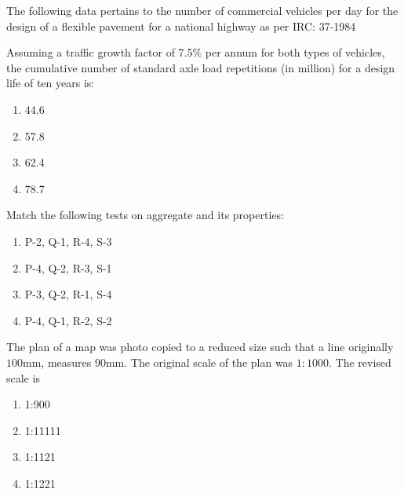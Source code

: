     \item{
	
			The following data pertains to the number of commercial vehicles per day for the design of a flexible pavement for a national highway as per IRC: 37-1984 
			
			
			
			Assuming a traffic growth factor of 7.5\% per annum for both types of vehicles, the cumulative number of standard axle load repetitions (in million) for a design life of ten years is:
			\text{   }\hfill
			
			\begin{multicols}{4}
				\begin{enumerate}
					\item 44.6
					\item 57.8
					\item 62.4
					\item 78.7
				\end{enumerate}
			\end{multicols}
			
		}
    \item{
	
			Match the following tests on aggregate and its properties:
			
			\text{   }\hfill
			
			\begin{multicols}{2}
				\begin{enumerate}
					\item  P-2, Q-1, R-4, S-3  
					
					\item  P-4, Q-2, R-3, S-1  
					 
					\item  P-3, Q-2, R-1, S-4  
					
					\item  P-4, Q-1, R-2, S-2  
				\end{enumerate}
			\end{multicols}
			
		}
    \item{
        
           The plan of a map was photo copied to a reduced size such that a line originally $100$mm, measures $90$mm. The original scale of the plan was $1:1000$. The revised scale is 
             \hfill
              
              \begin{multicols}{4}
              	\begin{enumerate}
              		\item 1:900
              		\item 1:11111
              		\item 1:1121
              		\item 1:1221
              	\end{enumerate}
              \end{multicols}
        
        }
